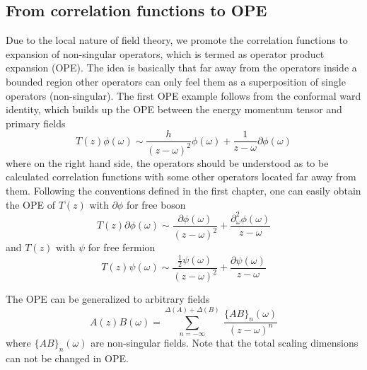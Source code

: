 \documentclass[submission, PhysLectNotes]{SciPost}
\begin{document}




\subsection{From correlation functions to OPE}
Due to the local nature of field theory, we promote the correlation functions to expansion of non-singular operators, which is termed as operator product expansion (OPE). The idea is basically that far away from the operators inside a bounded region other operators can only feel them as a superposition of single operators (non-singular). The first OPE example follows from the conformal ward identity, which builds up the OPE between the energy momentum tensor and primary fields
\begin{equation}
	T(z) \phi(\omega) \sim \frac{h}{\left(z-\omega\right)^2} \phi(\omega) + \frac{1}{z-\omega} \partial \phi(\omega)
\end{equation}
where on the right hand side, the operators should be understood as to be calculated correlation functions with some other operators located far away from them.  Following the conventions defined in the first chapter, one can easily obtain the OPE of $T(z)$ with $\partial \phi$ for free boson
\begin{equation}
T(z) \partial\phi(\omega) \sim \frac{\partial \phi(\omega)}{\left(z-\omega\right)^2} + \frac{\partial_\omega^2 \phi(\omega)}{z-\omega}
\end{equation}
and $T(z)$ with $\psi$ for free fermion
\begin{equation}
T(z) \psi(\omega) \sim \frac{\frac{1}{2} \psi(\omega)}{\left(z-\omega\right)^2} + \frac{\partial \psi(\omega)}{z-\omega}
\end{equation}

The OPE can be generalized to arbitrary fields
\begin{equation}
A(z) B(\omega) = \sum_{n=-\infty}^{\Delta(A) + \Delta(B)}\  \frac{\{AB\}_n(\omega)}{\left(z-\omega\right)^n}
\end{equation}
where $\{AB\}_n(\omega)$ are non-singular fields. Note that the total scaling dimensions can not be changed in OPE.
\end{document}
